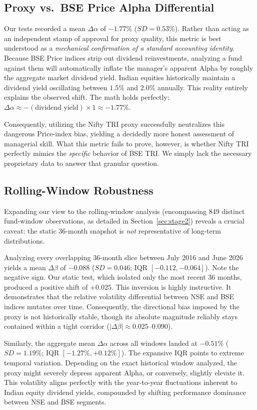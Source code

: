 \documentclass[conference]{IEEEtran}
\begin{document}
\subsection{Proxy vs.\ BSE Price Alpha Differential}
Our tests recorded a mean $\Delta\alpha$ of $-1.77\%$ ($SD=0.53\%$). Rather than acting as an independent stamp of approval for proxy quality, this metric is best understood as a \emph{mechanical confirmation of a standard accounting identity}. Because BSE Price indices strip out dividend reinvestments, analyzing a fund against them will automatically inflate the manager's apparent Alpha by roughly the aggregate market dividend yield. Indian equities historically maintain a dividend yield oscillating between $1.5\%$ and $2.0\%$ annually. This reality entirely explains the observed shift. The math holds perfectly: $\Delta\alpha \approx -(\text{dividend yield}) \times 1 \approx -1.77\%$. 

Consequently, utilizing the Nifty TRI proxy successfully neutralizes this dangerous Price-index bias, yielding a decidedly more honest assessment of managerial skill. What this metric fails to prove, however, is whether Nifty TRI perfectly mimics the \emph{specific} behavior of BSE TRI. We simply lack the necessary proprietary data to answer that granular question.

\subsection{Rolling-Window Robustness}
Expanding our view to the rolling-window analysis (encompassing 849 distinct fund-window observations, as detailed in Section~\ref{sec:stage2}) reveals a crucial caveat: the static 36-month snapshot is \emph{not} representative of long-term distributions. 

Analyzing every overlapping 36-month slice between July 2016 and June 2026 yields a mean $\Delta\beta$ of $-0.088$ ($SD=0.046$; IQR $[-0.112, -0.064]$). Note the negative sign. Our static test, which isolated only the most recent 36 months, produced a positive shift of $+0.025$. This inversion is highly instructive. It demonstrates that the relative volatility differential between NSE and BSE indices mutates over time. Consequently, the directional bias imposed by the proxy is not historically stable, though its absolute magnitude reliably stays contained within a tight corridor ($|\Delta\beta| \approx 0.025$--$0.090$).

Similarly, the aggregate mean $\Delta\alpha$ across all windows landed at $-0.51\%$ ($SD=1.19\%$; IQR $[-1.27\%, +0.12\%]$). The expansive IQR points to extreme temporal variation. Depending on the exact historical window analyzed, the proxy might severely depress apparent Alpha, or conversely, slightly elevate it. This volatility aligns perfectly with the year-to-year fluctuations inherent to Indian equity dividend yields, compounded by shifting performance dominance between NSE and BSE segments. 
\end{document}
